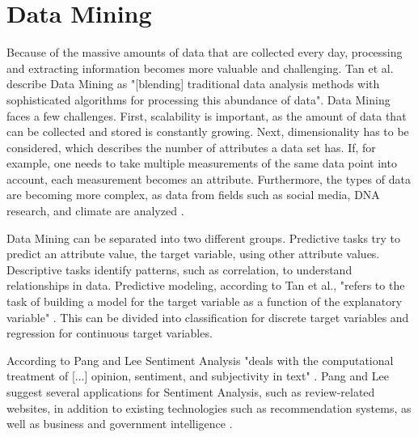 \section{Data Mining}
Because of the massive amounts of data that are collected every day, processing and extracting information becomes more valuable and challenging. Tan et al. describe Data Mining as "[blending] traditional data analysis methods with sophisticated algorithms for processing this abundance of data"\cite[p.~21]{DBLP:books/aw/TanSKK2019}. Data Mining faces a few challenges. First, scalability is important, as the amount of data that can be collected and stored is constantly growing. Next, dimensionality has to be considered, which describes the number of attributes a data set has. If, for example, one needs to take multiple measurements of the same data point into account, each measurement becomes an attribute. Furthermore, the types of data are becoming more complex, as data from fields such as social media, DNA research, and climate are analyzed \cite{DBLP:books/aw/TanSKK2019}.

Data Mining can be separated into two different groups. Predictive tasks try to predict an attribute value, the target variable, using other attribute values. Descriptive tasks identify patterns, such as correlation, to understand relationships in data. Predictive modeling, according to Tan et al., "refers to the task of building a model for the target variable as a function of the explanatory variable" \cite[p.~29]{DBLP:books/aw/TanSKK2019}. This can be divided into classification for discrete target variables and regression for continuous target variables. 


According to Pang and Lee Sentiment Analysis "deals with the computational treatment of [...] opinion, sentiment, and subjectivity in text" \cite[p.~5]{DBLP:journals/ftir/PangL07}.  Pang and Lee suggest several applications for Sentiment Analysis, such as review-related websites, in addition to existing technologies such as recommendation systems, as well as business and government intelligence \cite[p.~8]{DBLP:journals/ftir/PangL07}.

